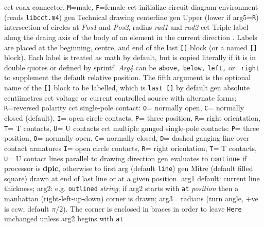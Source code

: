  {cct}
  {coax connector, {\tt M}=male, {\tt F}=female
    }
  {cct}
  {initialize circuit-diagram environment (reads {\tt libcct.m4})}
  {gen}
  {Technical drawing centerline}
  {gen}
  {Upper (lower if arg5={\tt R}) intersection of circles at
    {\sl Pos1} and {\sl Pos2}, radius {\sl rad1} and {\sl rad2}}
  {cct}
  {Triple label along the draing axis of the body of an element in the
    current direction .  Labels are placed at the
    beginning, centre, and end of the last {\tt []} block (or a named
    {\tt []} block). Each label is treated as math by default, but is
    copied literally if it is in double quotes or defined by sprintf.
    {\sl Arg4} can be {\tt above,} {\tt below,} {\tt left,} or {\tt
    right} to supplement the default relative position.  The fifth
    argument is the optional name of the {\tt []} block to be labelled,
    which is {\tt last []} by default}
  {gen}
  {absolute centiimetres}
  {cct}
  {voltage or current controlled source with alternate forms;
   {\tt R}=reversed polarity}
  {cct}
  {single-pole contact:
   {\tt O}= normally open,
   {\tt C}= normally closed (default),
   {\tt I}= open circle contacts,
   {\tt P}= three position,
   {\tt R}= right orientation,
   {\tt T}= T contacts,
   {\tt U}= U contacts
   }
  {cct}
  {multiple ganged single-pole contacts:
   {\tt P}= three position,
   {\tt O}= normally open,
   {\tt C}= normally closed,
   {\tt D}= dashed ganging line over contact armatures
   {\tt I}= open circle contacts,
   {\tt R}= right orientation,
   {\tt T}= T contacts,
   {\tt U}= U contact lines parallel to drawing direction
   }
  {gen}
  {evaluates to {\tt continue}
    if processor is {\bf dpic}, otherwise to first arg (default {\tt line})}
  {gen}
  { Mitre (default filled square) drawn at end of last line or at a
    given position.
    arg1 default: current line thickness;
    arg2: e.g. {\tt outlined} {\sl string}; if arg2 starts with
    {\tt at} {\sl position} then a manhattan (right-left-up-down) corner
    is drawn;
    arg3= radians (turn angle, +ve is ccw, default $\pi/2$).
    The corner is enclosed in braces
    in order to leave {\tt Here} unchanged unless arg2 begins with {\tt at}
    }
